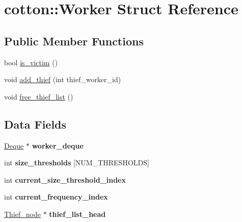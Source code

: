 \hypertarget{structcotton_1_1Worker}{}\section{cotton\+:\+:Worker Struct Reference}
\label{structcotton_1_1Worker}
\subsection*{Public Member Functions}
\begin{DoxyCompactItemize}
\item 
bool \mbox{\hyperlink{structcotton_1_1Worker_a1c6114b25a55f514124704d2073a9a9a}{is\+\_\+victim}} ()
\item 
void \mbox{\hyperlink{structcotton_1_1Worker_a8e28883823dae5e4c840236ab7168c00}{add\+\_\+thief}} (int thief\+\_\+worker\+\_\+id)
\item 
void \mbox{\hyperlink{structcotton_1_1Worker_a2c5e25bbc0b0e2417281ed2832b728a5}{free\+\_\+thief\+\_\+list}} ()
\end{DoxyCompactItemize}
\subsection*{Data Fields}
\begin{DoxyCompactItemize}
\item 
\mbox{\label{structcotton_1_1Worker_abc5dad171263747fea30a5a0cf617c3b}} 
\mbox{\hyperlink{structcotton_1_1Deque}{Deque}} $\ast$ {\bfseries worker\+\_\+deque}
\item 
\mbox{\label{structcotton_1_1Worker_af4fe8cd83fa710285068cf527be90f15}} 
int {\bfseries size\+\_\+thresholds} \mbox{[}N\+U\+M\+\_\+\+T\+H\+R\+E\+S\+H\+O\+L\+DS\mbox{]}
\item 
\mbox{\label{structcotton_1_1Worker_a982788617167e4d10f03d5f5adca48bc}} 
int {\bfseries current\+\_\+size\+\_\+threshold\+\_\+index}
\item 
\mbox{\label{structcotton_1_1Worker_a3f76c1b57bfd80a69d43757c0b236b46}} 
int {\bfseries current\+\_\+frequency\+\_\+index}
\item 
\mbox{\label{structcotton_1_1Worker_ae1e4d32682edf2db3ec7839c92a61551}} 
\mbox{\hyperlink{structcotton_1_1Thief__node}{Thief\+\_\+node}} $\ast$ {\bfseries thief\+\_\+list\+\_\+head}
\end{DoxyCompactItemize}


